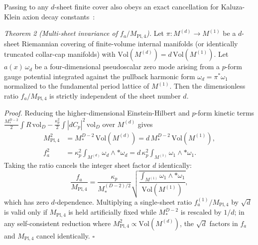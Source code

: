 \documentclass[aps,prd,twocolumn,nofootinbib,floatfix]{revtex4-2}
\begin{document}
Passing to any $d$-sheet finite cover also obeys an exact cancellation for Kaluza-Klein axion decay constants~\cite{SvrcekWitten2006}:

\emph{Theorem 2 (Multi-sheet invariance of $f_a/M_{\mathrm{Pl},4}$).}
Let $\pi: M^{(d)} \to M^{(1)}$ be a $d$-sheet Riemannian covering of finite-volume internal manifolds (or identically truncated collar-cap manifolds) with $\mathrm{Vol}(M^{(d)}) = d\,\mathrm{Vol}(M^{(1)})$.
Let $a(x)\,\omega_d$ be a four-dimensional pseudoscalar zero mode arising from a $p$-form gauge potential integrated against the pullback harmonic form $\omega_d = \pi^*\omega_1$ normalized to the fundamental period lattice of $M^{(1)}$.
Then the dimensionless ratio $f_a / M_{\mathrm{Pl},4}$ is strictly independent of the sheet number $d$.

\emph{Proof.}
Reducing the higher-dimensional Einstein-Hilbert and $p$-form kinetic terms $\frac{M_*^{D-2}}{2}\int R\,\mathrm{vol}_D - \frac{\kappa_p^2}{2}\int |dC_p|^2\,\mathrm{vol}_D$ over $M^{(d)}$ gives
\begin{align}
\label{eq:mpl_fa_scaling}
M_{\mathrm{Pl},4}^2 &= M_*^{D-2}\,\mathrm{Vol}(M^{(d)}) = d\,M_*^{D-2}\,\mathrm{Vol}(M^{(1)}), \nonumber\\
f_a^2 &= \kappa_p^2 \int_{M^{(d)}} \omega_d \wedge *\omega_d = d\,\kappa_p^2 \int_{M^{(1)}} \omega_1 \wedge *\omega_1.
\end{align}
Taking the ratio cancels the integer sheet factor $d$ identically:
\begin{equation}
\label{eq:fa_ratio_invariant}
\frac{f_a}{M_{\mathrm{Pl},4}} = \frac{\kappa_p}{M_*^{(D-2)/2}}\sqrt{\frac{\int_{M^{(1)}} \omega_1 \wedge *\omega_1}{\mathrm{Vol}(M^{(1)})}},
\end{equation}
which has zero $d$-dependence.
Multiplying a single-sheet ratio $f_a^{(1)}/M_{\mathrm{Pl},4}$ by $\sqrt{d}$ is valid only if $M_{\mathrm{Pl},4}$ is held artificially fixed while $M_*^{D-2}$ is rescaled by $1/d$; in any self-consistent reduction where $M_{\mathrm{Pl},4}^2 \propto \mathrm{Vol}(M^{(d)})$, the $\sqrt{d}$ factors in $f_a$ and $M_{\mathrm{Pl},4}$ cancel identically. $\square$
\end{document}

